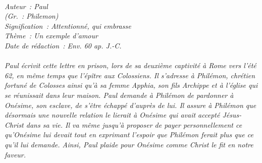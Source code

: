 \BFont
\noindent\hrulefill
{\footnotesize
\textit{
\bigskip
{\centering{}
\\Auteur~: Paul
\\(Gr.~: Philemon)
\\Signification~: Attentionné, qui embrasse
\\Thème~: Un exemple d'amour
\\Date de rédaction~: Env. 60 ap. J.-C.\\}
}
\textit{
\\Paul écrivit cette lettre en prison, lors de sa deuxième captivité à Rome vers l'été 62, en même temps que l'épître aux Colossiens. Il s'adresse à Philémon, chrétien fortuné de Colosses ainsi qu'à sa femme Apphia, son fils Archippe et à l'église qui se réunissait dans leur maison. Paul demande à Philémon de pardonner à Onésime, son esclave, de s'être échappé d'auprès de lui. Il assure à Philémon que désormais une nouvelle relation le lierait à Onésime qui avait accepté Jésus-Christ dans sa vie. Il va même jusqu'à proposer de payer personnellement ce qu'Onésime lui devait tout en exprimant l'espoir que Philémon ferait plus que ce qu'il lui demande. Ainsi, Paul plaide pour Onésime comme Christ le fit en notre faveur.\bigskip
}
}
\par\nobreak\noindent\hrulefill
